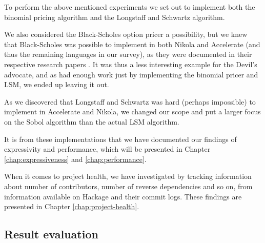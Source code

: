 


To perform the above mentioned experiments we set out to implement
both the binomial pricing algorithm and the Longstaff and Schwartz
algorithm. 

We also considered the Black-Scholes option pricer a possibility, but
we knew that Black-Scholes was possible to implement in both Nikola
and Accelerate (and thus the remaining languages in our survey), as
they were documented in their respective research papers
. It was thus a less interesting example for the Devil's
advocate, and as had enough work just by implementing the binomial
pricer and LSM, we ended up leaving it out.

As we discovered that Longstaff and Schwartz was hard (perhaps
impossible) to implement in Accelerate and Nikola, we changed our
scope and put a larger focus on the Sobol algorithm than the actual
LSM algorithm.

It is from these implementations that we have documented our findings
of expressivity and performance, which will be presented in Chapter
\ref{chap:expressiveness} and \ref{chap:performance}. 

When it comes to project health, we have investigated by tracking
information about number of contributors, number of reverse
dependencies and so on, from information available on Hackage and
their commit logs. These findings are presented in Chapter
\ref{chap:project-health}.

\subsection{Result evaluation}




